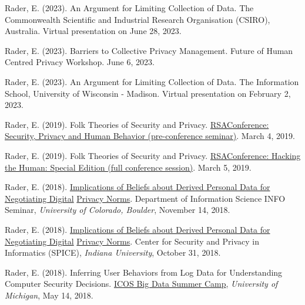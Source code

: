 \documentclass[9pt]{extarticle}
\makeatletter
\renewcommand{\section}{%
  \@startsection{section}{1}{0em}{\baselineskip}{3pt}{\large\bfseries\textsc}}
\makeatother
\begin{document}
\section{External Presentations}

Rader, E. (2023). An Argument for Limiting Collection of Data. The Commonwealth Scientific and Industrial Research Organisation (CSIRO), Australia. Virtual presentation on June 28, 2023.

Rader, E. (2023). Barriers to Collective Privacy Management. Future of Human Centred Privacy Workshop. June 6, 2023.

Rader, E. (2023). An Argument for Limiting Collection of Data. The Information School, University of Wisconsin - Madison. Virtual presentation on February 2, 2023.

Rader, E. (2019). Folk Theories of Security and Privacy. \href{https://www.rsaconference.com/industry-topics/presentation/security-privacy-and-human-behavior}{RSAConference: Security, Privacy and Human Behavior (pre-conference seminar)}. March 4, 2019.

Rader, E. (2019). Folk Theories of Security and Privacy. \href{https://www.rsaconference.com/industry-topics/presentation/security-privacy-and-human-behavior}{RSAConference: Hacking the Human: Special Edition (full conference session)}. March 5, 2019.

Rader, E. (2018). \href{https://calendar.colorado.edu/event/info_seminar_emilee_rader_implications_of_beliefs_about_derived_personal_data}{Implications of Beliefs about Derived Personal Data for Negotiating Digital} \href{https://calendar.colorado.edu/event/info_seminar_emilee_rader_implications_of_beliefs_about_derived_personal_data}{Privacy Norms}. Department of Information Science INFO Seminar, \emph{University of Colorado, Boulder}, November 14, 2018.

Rader, E. (2018). \href{https://spice.sice.indiana.edu/2018/11/02/spice-talk-series-features-professor-emilee-rader}{Implications of Beliefs about Derived Personal Data for Negotiating Digital} \href{https://spice.sice.indiana.edu/2018/11/02/spice-talk-series-features-professor-emilee-rader}{Privacy Norms}. Center for Security and Privacy in Informatics (SPICE), \emph{Indiana University}, October 31, 2018.

Rader, E. (2018). Inferring User Behaviors from Log Data for Understanding Computer Security Decisions. \href{https://icosbigdatacamp.github.io/2018-summer-camp/}{ICOS Big Data Summer Camp}, \emph{University of Michigan}, May 14, 2018.  
\end{document}
